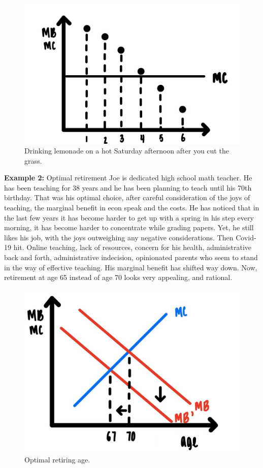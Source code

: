\documentclass[
]{book}
\begin{document}
\begin{figure}

{\centering \includegraphics[width=0.5\linewidth]{img/ch2/fig6} 

}

\caption{Drinking lemonade on a hot Saturday afternoon after you cut the grass.}\label{fig:fig206}
\end{figure}

\textbf{Example 2:} Optimal retirement
Joe is dedicated high school math teacher. He has been teaching for 38 years and he has been planning to teach until his 70th birthday. That was his optimal choice, after careful consideration of the joys of teaching, the marginal benefit in econ speak and the costs. He has noticed that in the last few years it has become harder to get up with a spring in his step every morning, it has become harder to concentrate while grading papers. Yet, he still likes his job, with the joys outweighing any negative considerations. Then Covid-19 hit. Online teaching, lack of resources, concern for his health, administrative back and forth, administrative indecision, opinionated parents who seem to stand in the way of effective teaching. His marginal benefit has shifted way down. Now, retirement at age 65 instead of age 70 looks very appealing, and rational.

\begin{figure}

{\centering \includegraphics[width=0.75\linewidth]{img/ch2/fig7} 

}

\caption{Optimal retiring age.}\label{fig:fig207}
\end{figure}
\end{document}
